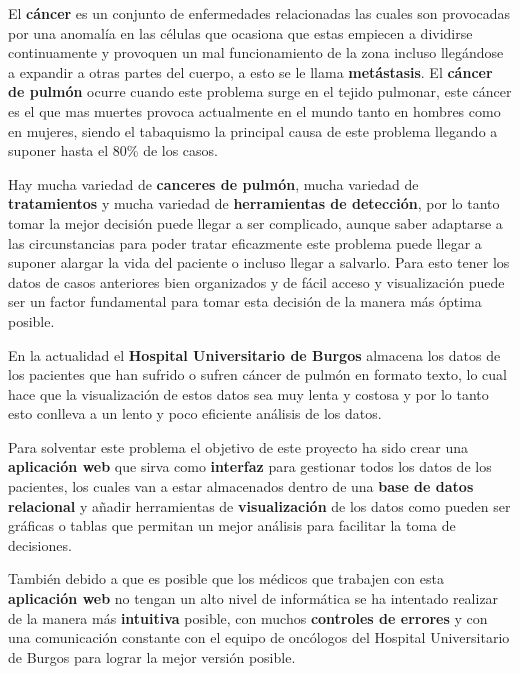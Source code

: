 El \textbf{cáncer} es un conjunto de enfermedades relacionadas las cuales son provocadas por una anomalía en las células que ocasiona que estas empiecen a dividirse continuamente y provoquen un mal funcionamiento de la zona incluso llegándose a expandir a otras partes del cuerpo, a esto se le llama \textbf{metástasis}\cite{cancerweb:online}. El \textbf{cáncer de pulmón} ocurre cuando este problema surge en el tejido pulmonar, este cáncer es el que mas muertes provoca actualmente en el mundo tanto en hombres como en mujeres, siendo el tabaquismo la principal causa de este problema llegando a suponer hasta el 80\% de los casos\cite{cancerpulmon:online}.

Hay mucha variedad de \textbf{canceres de pulmón}, mucha variedad de \textbf{tratamientos} y mucha variedad de \textbf{herramientas de detección}, por lo tanto tomar la mejor decisión puede llegar a ser complicado, aunque saber adaptarse a las circunstancias para poder tratar eficazmente este problema puede llegar a suponer alargar la vida del paciente o incluso llegar a salvarlo\cite{cancerpulmon2:online}. Para esto tener los datos de casos anteriores bien organizados y de fácil acceso y visualización puede ser un factor fundamental para tomar esta decisión de la manera más óptima posible.

En la actualidad el \textbf{Hospital Universitario de Burgos} almacena los datos de los pacientes que han sufrido o sufren cáncer de pulmón en formato texto, lo cual hace que la visualización de estos datos sea muy lenta y costosa y por lo tanto esto conlleva a un lento y poco eficiente análisis de los datos.

Para solventar este problema el objetivo de este proyecto ha sido crear una \textbf{aplicación web} que sirva como \textbf{interfaz} para gestionar todos los datos de los pacientes, los cuales van a estar almacenados dentro de una \textbf{base de datos relacional} y añadir herramientas de \textbf{visualización} de los datos como pueden ser gráficas o tablas que permitan un mejor análisis para facilitar la toma de decisiones.

También debido a que es posible que los médicos que trabajen con esta  \textbf{aplicación web} no tengan un alto nivel de informática se ha intentado realizar de la manera más \textbf{intuitiva} posible, con muchos  \textbf{controles de errores} y con una comunicación constante con el equipo de oncólogos del Hospital Universitario de Burgos para lograr la mejor versión posible.

